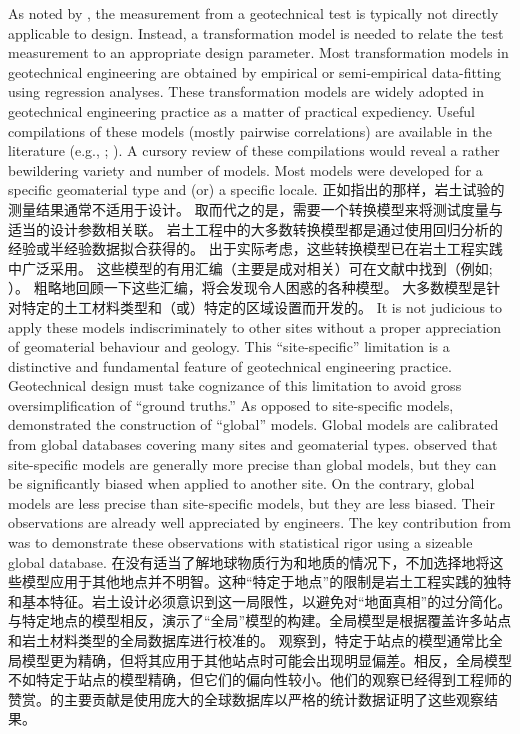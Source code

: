 \begin{Parallel}{0.60\textwidth}{}
{    }
    \ParallelPar
    \ParallelLText
    {
        As noted by \citet{Phoon1999612}, the measurement from a geotechnical test is typically not directly applicable to design. Instead, a transformation model is needed to relate the test measurement to an appropriate design parameter. Most transformation models in geotechnical engineering are obtained by empirical or semi-empirical data-fitting using regression analyses. These transformation models are widely adopted in geotechnical engineering practice as a matter of practical expediency. Useful compilations of these models (mostly pairwise correlations) are available in the literature (e.g., \citealp{Kulhawy1990}; \citealp{Mayne2001}). A cursory review of these compilations would reveal a rather bewildering variety and number of models. Most models were developed for a specific geomaterial type and (or) a specific locale.
    }
    \ParallelRText
    {
        正如\citet{Phoon1999612}指出的那样，岩土试验的测量结果通常不适用于设计。 取而代之的是，需要一个转换模型来将测试度量与适当的设计参数相关联。 岩土工程中的大多数转换模型都是通过使用回归分析的经验或半经验数据拟合获得的。 出于实际考虑，这些转换模型已在岩土工程实践中广泛采用。 这些模型的有用汇编（主要是成对相关）可在文献中找到（例如\citealp{Kulhawy1990}; \citealp{Mayne2001}）。 粗略地回顾一下这些汇编，将会发现令人困惑的各种模型。 大多数模型是针对特定的土工材料类型和（或）特定的区域设置而开发的。
    }
    \ParallelPar
    \ParallelLText
    {
        It is not judicious to apply these models indiscriminately to other sites without a proper appreciation of geomaterial behaviour and geology. This “site-specific” limitation is a distinctive and fundamental feature of geotechnical engineering practice. Geotechnical design must take cognizance of this limitation to avoid gross oversimplification of “ground truths.” As opposed to site-specific models, \citet{Ching201252} demonstrated the construction of “global” models. Global models are calibrated from global databases covering many sites and geomaterial types. \citet{Ching201252} observed that site-specific models are generally more precise than global models, but they can be significantly biased when applied to another site. On the contrary, global models are less precise than site-specific models, but they are less biased. Their observations are already well appreciated by engineers. The key contribution from \citet{Ching201252} was to demonstrate these observations with statistical rigor using
        a sizeable global database.
    }
    \ParallelRText
    {
        在没有适当了解地球物质行为和地质的情况下，不加选择地将这些模型应用于其他地点并不明智。这种“特定于地点”的限制是岩土工程实践的独特和基本特征。岩土设计必须意识到这一局限性，以避免对“地面真相”的过分简化。与特定地点的模型相反，\citet{Ching201252}演示了“全局”模型的构建。全局模型是根据覆盖许多站点和岩土材料类型的全局数据库进行校准的。 \citet{Ching201252}观察到，特定于站点的模型通常比全局模型更为精确，但将其应用于其他站点时可能会出现明显偏差。相反，全局模型不如特定于站点的模型精确，但它们的偏向性较小。他们的观察已经得到工程师的赞赏。\citet{Ching201252}的主要贡献是使用庞大的全球数据库以严格的统计数据证明了这些观察结果。
}
\end{Parallel}

